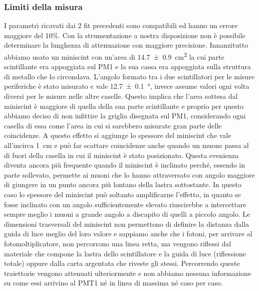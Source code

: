 \subsubsection{Limiti della misura}

I parametri ricavati dai 2 fit precedenti sono compatibili ed hanno un errore maggiore del 10\%. Con la strumentazione a nostra disposizione non è possibile determinare la lunghezza di attenuazione con maggiore precisione. Innanzitutto abbiamo usato un miniscint con un'area di \SI{14.7\pm0.9}{cm^2} la cui parte scintillante era appoggiata sul PM1 e la sua cassa  era appoggiata sulla struttura di metallo che lo circondava. L'angolo formato tra i due scintillatori per le misure periferiche è stato misurato e vale \SI{12.7\pm0.1}{\degree}, invece assume valori ogni volta diversi per le misure nelle altre caselle. Questo implica che l'area sottesa dal miniscint è maggiore di quella della sua parte scintillante e proprio per questo abbiamo deciso di non infittire la griglia disegnata sul PM1, considerando ogni casella di essa come l'area in cui si sarebbero misurate gran parte delle coincidenze. A questo effetto si aggiunge lo spessore del miniscint che vale all'incirca \SI{1}{cm} e può far scattare coincidenze anche quando un muone passa al di fuori della casella in cui il miniscint è stato posizionato. Questa evenienza diventa ancora più frequente quando il miniscint è inclinato perché, essendo in parte sollevato, permette ai muoni che lo hanno attraversato con angolo maggiore di giungere in un punto ancora più lontano della lastra sottostante. In questo caso lo spessore del miniscint può soltanto amplificarne l'effetto, in quanto se fosse inclinato con un angolo sufficientemente elevato riuscirebbe a intercettare sempre meglio  i muoni a grande angolo a discapito di quelli a piccolo angolo.
Le dimensioni trasversali del miniscint non permettono di definire la distanza dalla guida di luce meglio del loro valore e sappiamo anche che i fotoni, per arrivare al fotomoltiplicatore,  non percorrono una linea retta, ma vengono riflessi dal materiale che compone la lastra dello scintillatore e la guida di luce (riflessione totale) oppure dalla carta argentata che riveste gli stessi. Percorrendo queste traiettorie vengono attenuati ulteriormente e non abbiamo nessuna informazione su come essi arrivino al PMT1 né in linea di massima né caso per caso.
